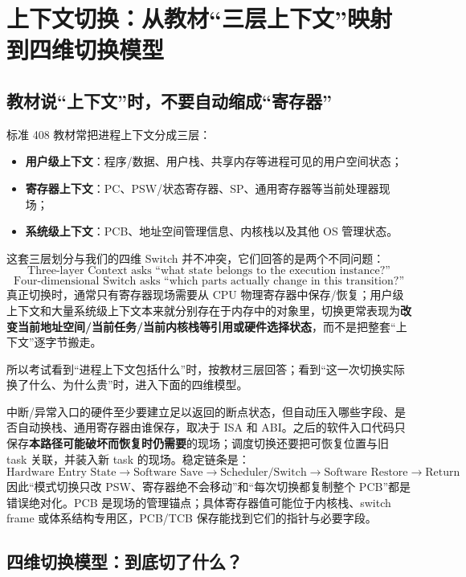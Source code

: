 \documentclass[11pt,a4paper]{ctexart}
\newcommand{\kw}[1]{\textbf{#1}}
\begin{document}
\section{上下文切换：从教材“三层上下文”映射到四维切换模型}

\subsection{教材说“上下文”时，不要自动缩成“寄存器”}

标准 408 教材常把进程上下文分成三层：
\begin{itemize}
\item \kw{用户级上下文}：程序/数据、用户栈、共享内存等进程可见的用户空间状态；
\item \kw{寄存器上下文}：PC、PSW/状态寄存器、SP、通用寄存器等当前处理器现场；
\item \kw{系统级上下文}：PCB、地址空间管理信息、内核栈以及其他 OS 管理状态。
\end{itemize}

这套三层划分与我们的四维 Switch 并不冲突，它们回答的是两个不同问题：
\[
\boxed{\text{Three-layer Context asks “what state belongs to the execution instance?”}}
\]
\[
\boxed{\text{Four-dimensional Switch asks “which parts actually change in this transition?”}}
\]
真正切换时，通常只有寄存器现场需要从 CPU 物理寄存器中保存/恢复；用户级上下文和大量系统级上下文本来就分别存在于内存中的对象里，切换更常表现为\kw{改变当前地址空间/当前任务/当前内核栈等引用或硬件选择状态}，而不是把整套“上下文”逐字节搬走。

所以考试看到“进程上下文包括什么”时，按教材三层回答；看到“这一次切换实际换了什么、为什么贵”时，进入下面的四维模型。

\begin{method}
中断/异常入口的硬件至少要建立足以返回的断点状态，但自动压入哪些字段、是否自动换栈、通用寄存器由谁保存，取决于 ISA 和 ABI。之后的软件入口代码只保存\kw{本路径可能破坏而恢复时仍需要}的现场；调度切换还要把可恢复位置与旧 task 关联，并装入新 task 的现场。稳定链条是：
\[
\boxed{\text{Hardware Entry State}\to\text{Software Save}\to
\text{Scheduler/Switch}\to\text{Software Restore}\to\text{Return}}
\]
因此“模式切换只改 PSW、寄存器绝不会移动”和“每次切换都复制整个 PCB”都是错误绝对化。PCB 是现场的管理锚点；具体寄存器值可能位于内核栈、switch frame 或体系结构专用区，PCB/TCB 保存能找到它们的指针与必要字段。
\end{method}

\subsection{四维切换模型：到底切了什么？}
\end{document}
